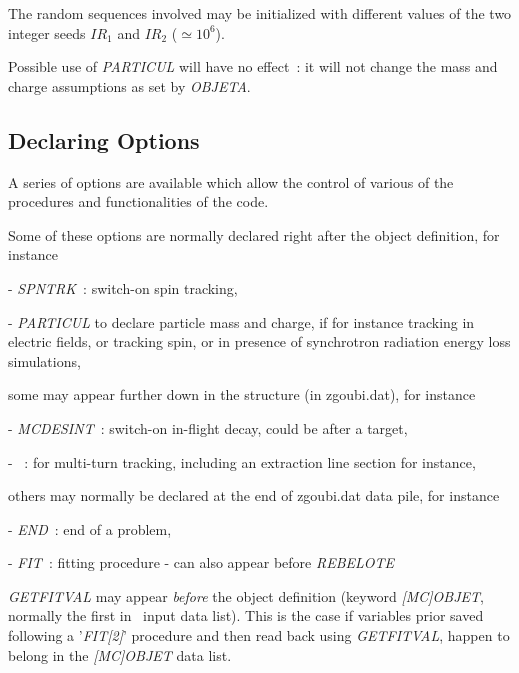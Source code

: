 \noindent The random sequences involved may be initialized with different
values of the 
two integer seeds $ IR_1 $ and $ IR_2 $ ($\simeq 10^6 $). 

\bigskip

\noindent Possible use of \textsl{PARTICUL} will have no effect~: it will not change the mass
 and charge assumptions as set  by \textsl{OBJETA}.


\newpage

\subsection{Declaring  Options} \label{sec4.3}

A series of options are available which allow the control of various of the procedures and 
functionalities of the code. 

\medskip

\noindent Some of these options are normally declared right after 
the object definition, for instance 

- \textsl{SPNTRK}~:  switch-on spin tracking, 

- \textsl{PARTICUL} to declare particle mass and charge, if for instance tracking in electric fields, 
or tracking spin, or in presence of synchrotron radiation energy loss simulations, 

\medskip 

\noindent  some may appear further down in the structure (in zgoubi.dat), for instance 

- \textsl{MCDESINT}~: switch-on in-flight decay, could be after a target, 

- \REBELOTE{}~: for    multi-turn tracking, 
including  an extraction line section for instance, 

\medskip

\noindent others may  normally be declared at the end of zgoubi.dat  data pile, for instance

- \textsl{END}~:  end of a problem, 

- \textsl{FIT}~: fitting procedure - can also appear before \textsl{REBELOTE}


\medskip

\noindent \textsl{GETFITVAL} may appear 
\textsl{before} the object definition (keyword \textsl{[MC]OBJET}, normally the first in \zgou\ input data list). This is 
the case if  variables prior saved following a '\textsl{FIT[2]}' procedure 
and then read back using \textsl{GETFITVAL}, happen to belong in the \textsl{[MC]OBJET} data list. 

